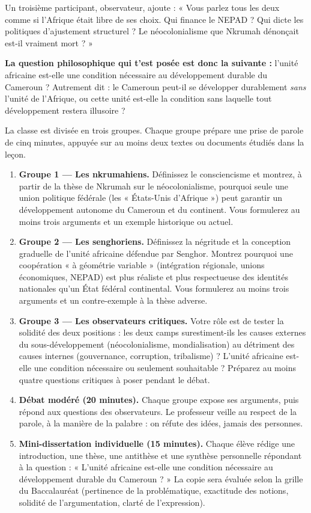 \documentclass[11pt]{article}
\newcommand{\cle}[1]{{\popxbold\color{popdark}#1}}
\newcounter{popsec}
\newcounter{popsub}
\newcommand{\courssub}[1]{%
  \stepcounter{popsub}%
  \par\vspace{9pt}\noindent{\popxbold\fontsize{11.5}{13}\selectfont\color{popink}{\color{poporange}\thepopsec.\thepopsub}\hspace{6pt}#1}\par\nopagebreak\vspace{4pt}
}
\begin{document}
Un troisième participant, observateur, ajoute : « Vous parlez tous les deux comme si l'Afrique était libre de ses choix. Qui finance le NEPAD ? Qui dicte les politiques d'ajustement structurel ? Le néocolonialisme que Nkrumah dénonçait est-il vraiment mort ? »

\textbf{La question philosophique qui t'est posée est donc la suivante :} l'unité africaine est-elle une condition nécessaire au développement durable du Cameroun ? Autrement dit : le Cameroun peut-il se développer durablement \emph{sans} l'unité de l'Afrique, ou cette unité est-elle la condition sans laquelle tout développement restera illusoire ?

\courssub{Consignes}

La classe est divisée en trois groupes. Chaque groupe prépare une prise de parole de cinq minutes, appuyée sur au moins deux textes ou documents étudiés dans la leçon.

\begin{enumerate}
\item \textbf{Groupe 1 — Les nkrumahiens.} Définissez le consciencisme et montrez, à partir de la thèse de Nkrumah sur le néocolonialisme, pourquoi seule une union politique fédérale (les « États-Unis d'Afrique ») peut garantir un développement autonome du Cameroun et du continent. Vous formulerez au moins trois arguments et un exemple historique ou actuel.

\item \textbf{Groupe 2 — Les senghoriens.} Définissez la négritude et la conception graduelle de l'unité africaine défendue par Senghor. Montrez pourquoi une coopération « à géométrie variable » (intégration régionale, unions économiques, NEPAD) est plus réaliste et plus respectueuse des identités nationales qu'un État fédéral continental. Vous formulerez au moins trois arguments et un contre-exemple à la thèse adverse.

\item \textbf{Groupe 3 — Les observateurs critiques.} Votre rôle est de tester la solidité des deux positions : les deux camps surestiment-ils les causes externes du sous-développement (néocolonialisme, mondialisation) au détriment des causes internes (gouvernance, corruption, tribalisme) ? L'unité africaine est-elle une condition \cle{nécessaire} ou seulement \cle{souhaitable} ? Préparez au moins quatre questions critiques à poser pendant le débat.

\item \textbf{Débat modéré (20 minutes).} Chaque groupe expose ses arguments, puis répond aux questions des observateurs. Le professeur veille au respect de la parole, à la manière de la palabre : on réfute des idées, jamais des personnes.

\item \textbf{Mini-dissertation individuelle (15 minutes).} Chaque élève rédige une introduction, une thèse, une antithèse et une synthèse personnelle répondant à la question : « L'unité africaine est-elle une condition nécessaire au développement durable du Cameroun ? » La copie sera évaluée selon la grille du Baccalauréat (pertinence de la problématique, exactitude des notions, solidité de l'argumentation, clarté de l'expression).
\end{enumerate}
\end{document}
